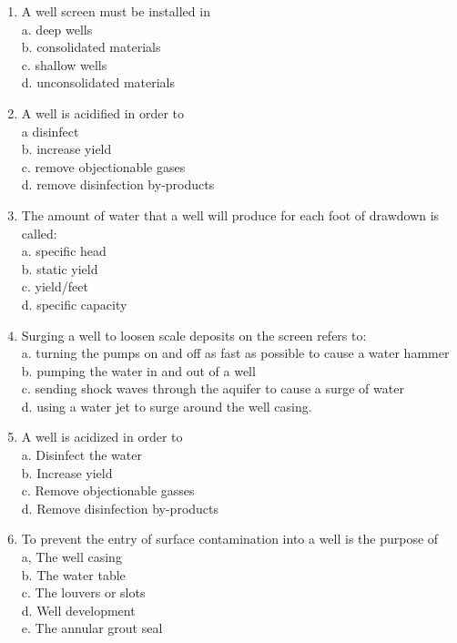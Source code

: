 \begin{enumerate}
\item A well screen must be installed in\\
a.	deep wells\\
b.	consolidated materials\\
c.	shallow wells\\
d.	unconsolidated materials

\item A well is acidified in order to\\
a	disinfect\\
b.	increase yield\\
c.	remove objectionable gases\\
d.	 remove disinfection by-products\\

\item The amount of water that a well will produce for each foot of drawdown is called:\\
a.	specific head\\
b.	static yield\\
c.	yield/feet\\
d.	specific capacity\\

\item Surging a well to loosen scale deposits on the screen refers to:\\
a.	turning the pumps on and off as fast as possible to cause a water hammer\\
b.	pumping the water in and out of a well\\
c.	sending shock waves through the aquifer to cause a surge of water\\
d.	using a water jet to surge around the well casing.\\


\item A well is acidized in order to\\
a. Disinfect the water\\
b. Increase yield\\
c. Remove objectionable gasses\\
d. Remove disinfection by-products

\item To prevent the entry of surface contamination into a well is the purpose of\\
a, The well casing\\
b. The water table\\
c. The louvers or slots\\
d. Well development\\
e. The annular grout seal\\


\end{enumerate}
